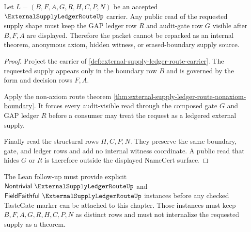 \begin{theorem}
\label{thm:external-supply-ledger-route-audit-memory}
Let $L=(B,F,A,G,R,H,C,P,N)$ be an accepted $\ExternalSupplyLedgerRouteUp$ carrier. Any public read of the requested supply shape must keep the GAP ledger row $R$ and audit-gate row $G$ visible after $B,F,A$ are displayed. Therefore the packet cannot be repacked as an internal theorem, anonymous axiom, hidden witness, or erased-boundary supply source.
\end{theorem}
\begin{proof}
Project the carrier of \autoref{def:external-supply-ledger-route-carrier}. The requested supply appears only in the boundary row $B$ and is governed by the form and decision rows $F,A$.

Apply the non-axiom route theorem \autoref{thm:external-supply-ledger-route-nonaxiom-boundary}. It forces every audit-visible read through the composed gate $G$ and GAP ledger $R$ before a consumer may treat the request as a ledgered external supply.

Finally read the structural rows $H,C,P,N$. They preserve the same boundary, gate, and ledger rows and add no internal witness coordinate. A public read that hides $G$ or $R$ is therefore outside the displayed NameCert surface.
\end{proof}



The Lean follow-up must provide explicit $\mathsf{Nontrivial}\ \ExternalSupplyLedgerRouteUp$ and $\mathsf{FieldFaithful}\ \ExternalSupplyLedgerRouteUp$ instances before any checked TasteGate marker can be attached to this chapter. Those instances must keep $B,F,A,G,R,H,C,P,N$ as distinct rows and must not internalize the requested supply as a theorem.


